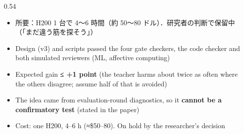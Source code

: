 \begin{frame}{}
\begin{columns}[T]
\begin{column}{0.54\textwidth}
{\begin{itemize}
\item 所要：H200 1 台で 4〜6 時間（約 50〜80 ドル）．研究者の判断で保留中（「まだ違う筋を探そう」）
\end{itemize}
}{%
\begin{itemize}
\item Design (v3) and scripts passed the four gate checkers, the code checker and both simulated reviewers (ML, affective computing)
\item Expected gain \textbf{≤ +1 point} (the teacher harms about twice as often where the others disagree; assume half of that is avoided)
\item The idea came from evaluation-round diagnostics, so it \textbf{cannot be a confirmatory test} (stated in the paper)
\item Cost: one H200, 4--6 h (≈\$50--80). On hold by the researcher's decision
\end{itemize}
}
\end{column}
\end{columns}
\end{frame}
